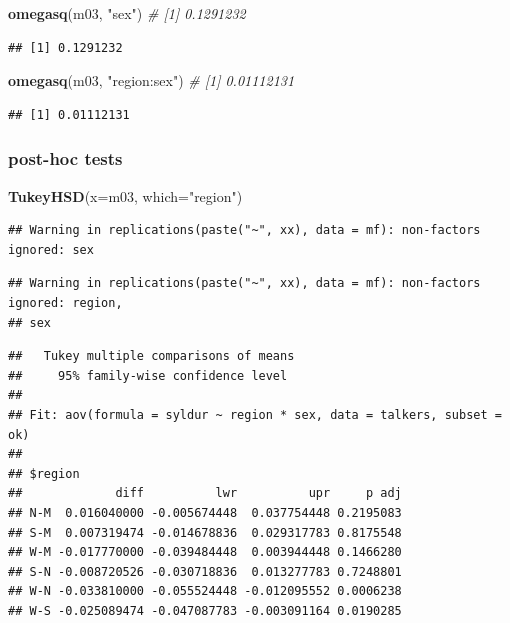 \documentclass[
]{book}
\newenvironment{Shaded}{\begin{snugshade}}{\end{snugshade}}
\newcommand{\CommentTok}[1]{\textcolor[rgb]{0.56,0.35,0.01}{\textit{#1}}}
\newcommand{\DataTypeTok}[1]{\textcolor[rgb]{0.13,0.29,0.53}{#1}}
\newcommand{\KeywordTok}[1]{\textcolor[rgb]{0.13,0.29,0.53}{\textbf{#1}}}
\newcommand{\NormalTok}[1]{#1}
\newcommand{\StringTok}[1]{\textcolor[rgb]{0.31,0.60,0.02}{#1}}
\begin{document}
\begin{Shaded}
\begin{Highlighting}[]
\KeywordTok{omegasq}\NormalTok{(m03, }\StringTok{"sex"}\NormalTok{)         }\CommentTok{\# [1] 0.1291232}
\end{Highlighting}
\end{Shaded}

\begin{verbatim}
## [1] 0.1291232
\end{verbatim}

\begin{Shaded}
\begin{Highlighting}[]
\KeywordTok{omegasq}\NormalTok{(m03, }\StringTok{"region:sex"}\NormalTok{)  }\CommentTok{\# [1] 0.01112131}
\end{Highlighting}
\end{Shaded}

\begin{verbatim}
## [1] 0.01112131
\end{verbatim}

\hypertarget{post-hoc-tests}{%
\subsubsection{post-hoc tests}\label{post-hoc-tests}}

\begin{Shaded}
\begin{Highlighting}[]
\KeywordTok{TukeyHSD}\NormalTok{(}\DataTypeTok{x=}\NormalTok{m03, }\DataTypeTok{which=}\StringTok{"region"}\NormalTok{)}
\end{Highlighting}
\end{Shaded}

\begin{verbatim}
## Warning in replications(paste("~", xx), data = mf): non-factors ignored: sex
\end{verbatim}

\begin{verbatim}
## Warning in replications(paste("~", xx), data = mf): non-factors ignored: region,
## sex
\end{verbatim}

\begin{verbatim}
##   Tukey multiple comparisons of means
##     95% family-wise confidence level
## 
## Fit: aov(formula = syldur ~ region * sex, data = talkers, subset = ok)
## 
## $region
##             diff          lwr          upr     p adj
## N-M  0.016040000 -0.005674448  0.037754448 0.2195083
## S-M  0.007319474 -0.014678836  0.029317783 0.8175548
## W-M -0.017770000 -0.039484448  0.003944448 0.1466280
## S-N -0.008720526 -0.030718836  0.013277783 0.7248801
## W-N -0.033810000 -0.055524448 -0.012095552 0.0006238
## W-S -0.025089474 -0.047087783 -0.003091164 0.0190285
\end{verbatim}
\end{document}
